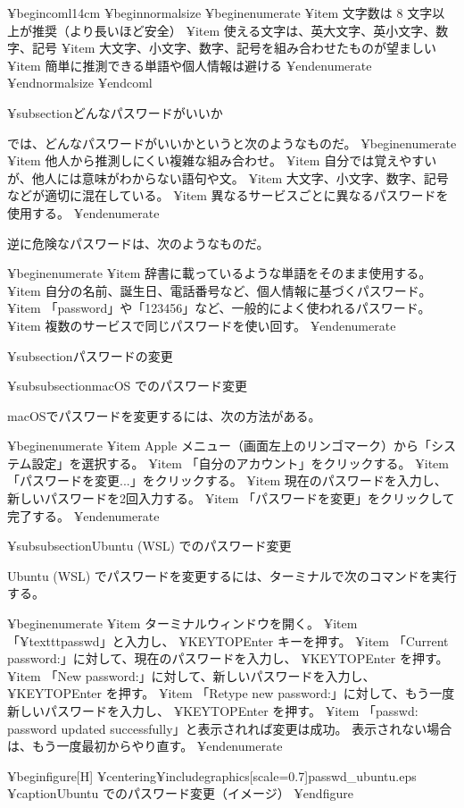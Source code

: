 ¥begin{coml}{14cm}
¥begin{normalsize}
¥begin{enumerate}
¥item 文字数は 8 文字以上が推奨（より長いほど安全）
¥item 使える文字は、英大文字、英小文字、数字、記号
¥item 大文字、小文字、数字、記号を組み合わせたものが望ましい
¥item 簡単に推測できる単語や個人情報は避ける
¥end{enumerate}
¥end{normalsize}
¥end{coml}

¥subsection{どんなパスワードがいいか}

では、どんなパスワードがいいかというと次のようなものだ。
¥begin{enumerate}
¥item 他人から推測しにくい複雑な組み合わせ。
¥item 自分では覚えやすいが、他人には意味がわからない語句や文。
¥item 大文字、小文字、数字、記号などが適切に混在している。
¥item 異なるサービスごとに異なるパスワードを使用する。
¥end{enumerate}

逆に危険なパスワードは、次のようなものだ。

¥begin{enumerate}
¥item 辞書に載っているような単語をそのまま使用する。
¥item 自分の名前、誕生日、電話番号など、個人情報に基づくパスワード。
¥item 「password」や「123456」など、一般的によく使われるパスワード。
¥item 複数のサービスで同じパスワードを使い回す。
¥end{enumerate}

¥subsection{パスワードの変更}

¥subsubsection{macOS でのパスワード変更}

macOSでパスワードを変更するには、次の方法がある。

¥begin{enumerate}
¥item Apple メニュー（画面左上のリンゴマーク）から「システム設定」を選択する。
¥item 「自分のアカウント」をクリックする。
¥item 「パスワードを変更...」をクリックする。
¥item 現在のパスワードを入力し、新しいパスワードを2回入力する。
¥item 「パスワードを変更」をクリックして完了する。
¥end{enumerate}

¥subsubsection{Ubuntu (WSL) でのパスワード変更}

Ubuntu (WSL) でパスワードを変更するには、ターミナルで次のコマンドを実行する。

¥begin{enumerate}
¥item ターミナルウィンドウを開く。
¥item 「¥texttt{passwd}」と入力し、 ¥KEYTOP{Enter} キーを押す。
¥item 「Current password:」に対して、現在のパスワードを入力し、 ¥KEYTOP{Enter} を押す。
¥item 「New password:」に対して、新しいパスワードを入力し、 ¥KEYTOP{Enter} を押す。
¥item 「Retype new password:」に対して、もう一度新しいパスワードを入力し、
 ¥KEYTOP{Enter} を押す。
¥item 「passwd: password updated successfully」と表示されれば変更は成功。
表示されない場合は、もう一度最初からやり直す。
¥end{enumerate}

¥begin{figure}[H]
¥centering{¥includegraphics[scale=0.7]{passwd_ubuntu.eps}}
¥caption{Ubuntu でのパスワード変更（イメージ）}
¥end{figure}

